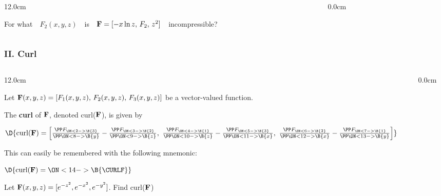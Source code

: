 \begin{frame}
\frametitle{}
\scriptsize
\begin{columns}
\begin{column}{12.0cm}

\EX For what \,\, $F_2(x,y,z)$ \,\, is \,\, ${\bf F} = [-x\ln z,\, F_2,\, z^2]$ \,\, incompressible?

\vspace{0.2cm}

\SOL

\vspace{7.8cm}

	
\end{column}
\begin{column}{0.0cm}\end{column}
\end{columns}
\end{frame}

\begin{frame}
\frametitle{II. Curl}
\scriptsize
\begin{columns}
\begin{column}{12.0cm}

\DEF Let \quad ${\bf F}(x,y,z) = [F_1(x,y,z),\,F_2(x,y,z),\,F_3(x,y,z)]$ \quad be a vector-valued function.

\vspace{0.2cm}

The {\bf curl} of ${\bf F}$, denoted curl(${\bf F}$), is given by
\begin{center}
	$\D{\text{curl}({\bf F}) = \left[\frac{\PP F_{
	\ON<2->{\B{3}}}}{\PP 
	\ON<8->{\B{y}}} - \frac{\PP F_{
	\ON<3->{\B{2}}}}{\PP 
	\ON<9->{\B{z}}},\,\, \frac{\PP F_{
	\ON<4->{\B{1}}}}{\PP 
	\ON<10->{\B{z}}} - \frac{\PP F_{
	\ON<5->{\B{3}}}}{\PP 
	\ON<11->{\B{x}}}, \,\,\frac{\PP F_{
	\ON<6->{\B{2}}}}{\PP 
	\ON<12->{\B{x}}} - \frac{\PP F_{
	\ON<7->{\B{1}}}}{\PP 
	\ON<13->{\B{y}}}\right]}$
\end{center}
This can easily be remembered with the following mnemonic:
\begin{center}
	$\D{\text{curl}({\bf F}) = \ON<14->{\B{\CURLF}} }$
\end{center}
\EX Let ${\bf F}(x,y,z) = [e^{-z^2},e^{-x^2},e^{-y^2}]$.  Find curl(${\bf F}$)

\vspace{0.1cm}

\SOL

\vspace{4.2cm}

\end{column}
\begin{column}{0.0cm}\end{column}
\end{columns}
\end{frame}

